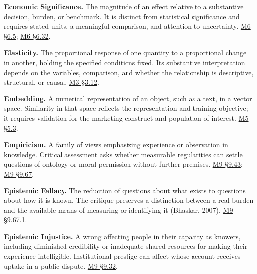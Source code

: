 \noindent\textbf{Economic Significance.} The magnitude of an effect relative to a
substantive decision, burden, or benchmark. It is distinct from
statistical significance and requires stated units, a meaningful
comparison, and attention to uncertainty.
\href{Marketing_Analytics_Lecture_Notes.pdf\#M06-power-precision-and-the-minimum-useful-effect}{M6
§6.5};
\href{Marketing_Analytics_Lecture_Notes.pdf\#M06-statistical-detection-and-a-profitable-campaign}{M6
§6.32}.

\noindent\textbf{Elasticity.} The proportional response of one quantity to a
proportional change in another, holding the specified conditions fixed.
Its substantive interpretation depends on the variables, comparison, and
whether the relationship is descriptive, structural, or causal.
\href{Marketing_Analytics_Lecture_Notes.pdf\#M03-price-elasticity-when-prices-respond-to-demand}{M3
§3.12}.

\noindent\textbf{Embedding.} A numerical representation of an object, such as a
text, in a vector space. Similarity in that space reflects the
representation and training objective; it requires validation for the
marketing construct and population of interest.
\href{Marketing_Analytics_Lecture_Notes.pdf\#M05-embeddings-and-semantic-similarity}{M5
§5.3}.

\noindent\textbf{Empiricism.} A family of views emphasizing experience or
observation in knowledge. Critical assessment asks whether measurable
regularities can settle questions of ontology or moral permission
without further premises.
\hyperref[M09-philosophical-critiques-of-empiricism-and-reduction]{M9
§9.43};
\hyperref[M09-philosophical-grounds-for-the-critique]{M9
§9.67}.

\noindent\textbf{Epistemic Fallacy.} The reduction of questions about what exists
to questions about how it is known. The critique preserves a distinction
between a real burden and the available means of measuring or
identifying it (Bhaskar, 2007).
\hyperref[M09-abstraction-and-the-object-represented]{M9
§9.67.1}.

\noindent\textbf{Epistemic Injustice.} A wrong affecting people in their capacity
as knowers, including diminished credibility or inadequate shared
resources for making their experience intelligible. Institutional
prestige can affect whose account receives uptake in a public dispute.
\hyperref[M09-who-counts-as-a-stakeholder-and-why]{M9
§9.32}.

